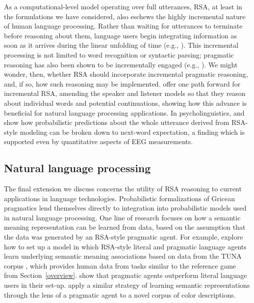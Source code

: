 \documentclass[10pt,letterpaper]{article}
\begin{document}
As a computational-level model operating over full utterances, RSA, at least in the formulations we have considered, also eschews the highly incremental nature of human language processing. Rather than waiting for utterances to terminate before reasoning about them, language users begin integrating information as soon as it arrives during the linear unfolding of time (e.g., \cite{tanenhausetal1995}). This incremental processing is not limited to word recognition or syntactic parsing; pragmatic reasoning has also been shown to be incrementally engaged (e.g., \cite{sedivyetal1999,sedivy2007}). We might wonder, then, whether RSA should incorporate incremental pragmatic reasoning, and, if so, how such reasoning may be implemented. \cite{cohngordgonetal2019} offer one path forward for incremental RSA, amending the speaker and listener models so that they reason about individual words and potential continuations, showing how this advance is beneficial for natural language processing applications.
In psycholinguistics, \cite{WerningCosentino2017:The-interaction} and \cite{AugurzkyFranke2019:Gricean-expecta} show how probabilistic predictions about the whole utterance derived from RSA-style modeling can be broken down to next-word expectation, a finding which is supported even by quantitative aspects of EEG measurements.

\subsection*{Natural language processing}

The final extension we discuss concerns the utility of RSA reasoning to current applications in language technologies. 
Probabilistic formalizations of Gricean pragmatics lend themselves directly to integration into probabilistic models used in natural language processing.
One line of research focuses on how a semantic meaning representation can be learned from data, based on the assumption that the data was generated by an RSA-style pragmatic agent.
For example, \cite{Monroe:Potts:2015} explore how to set up a model in which RSA-style literal and pragmatic language agents learn underlying semantic meaning associations based on data from the TUNA corpus \cite{DeemterSluis2006:Building-a-Sema}, which provides human data from tasks similar to the reference game from Section~\ref{overview}.
\cite{Monroe:Potts:2015} show that pragmatic agents outperform literal language users in their set-up.
\cite{Monroe:Hawkins:Goodman:Potts:2017} apply a similar strategy of learning semantic representations through the lens of a pragmatic agent to a novel corpus of color descriptions.
\end{document}
